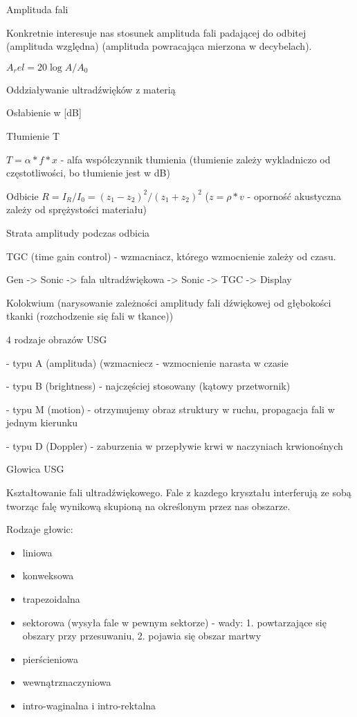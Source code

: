 \documentclass{article}
\begin{document}
Amplituda fali

Konkretnie interesuje nas stosunek amplituda fali padającej do odbitej (amplituda względna) (amplituda powracająca mierzona w decybelach).

$A_rel = 20 \log{A/A_0}$

Oddziaływanie ultradźwięków z materią

Osłabienie w [dB]

Tłumienie T

$T = \alpha * f * x$ - alfa współczynnik tłumienia (tłumienie zależy wykladniczo od częstotliwości, bo tłumienie jest w dB)

Odbicie $R = I_R / I_0 = (z_1 - z_2)^2 / (z_1 + z_2)^2$ ($z = \rho * v$ - oporność akustyczna zależy od sprężystości materiału)

Strata amplitudy podczas odbicia

TGC (time gain control) - wzmacniacz, którego wzmocnienie zależy od czasu.

Gen -> Sonic -> fala ultradźwiękowa -> Sonic -> TGC -> Display

Kolokwium (narysowanie zależności amplitudy fali dźwiękowej od głębokości tkanki (rozchodzenie się fali w tkance)) 

4 rodzaje obrazów USG

- typu A (amplituda) (wzmacniecz - wzmocnienie narasta w czasie

- typu B (brightness) - najczęściej stosowany (kątowy przetwornik)

- typu M (motion) - otrzymujemy obraz struktury w ruchu, propagacja fali w jednym kierunku

- typu D (Doppler) - zaburzenia w przepływie krwi w naczyniach krwionośnych

Głowica USG

Kształtowanie fali ultradźwiękowego. Fale z kazdego kryształu interferują ze sobą tworząc falę wynikową skupioną na określonym przez nas obszarze.

Rodzaje głowic:
\begin{itemize}
    \item liniowa
    \item konweksowa
    \item trapezoidalna
    \item sektorowa (wysyła fale w pewnym sektorze) - wady: 1. powtarzające się obszary przy przesuwaniu, 2. pojawia się obszar martwy
    \item pierścieniowa
    \item wewnątrznaczyniowa
    \item intro-waginalna i intro-rektalna
\end{itemize}
\end{document}
